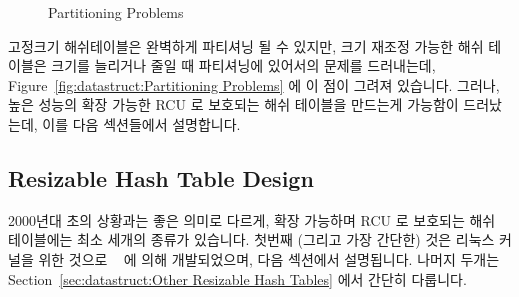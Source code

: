 \begin{figure}[tb]
\centering
{}
\caption{Partitioning Problems}
\end{figure}

고정크기 해쉬테이블은 완벽하게 파티셔닝 될 수 있지만, 크기 재조정 가능한 해쉬
테이블은 크기를 늘리거나 줄일 때 파티셔닝에 있어서의 문제를 드러내는데,
Figure~\ref{fig:datastruct:Partitioning Problems} 에 이 점이 그려져 있습니다.
그러나, 높은 성능의 확장 가능한 RCU 로 보호되는 해쉬 테이블을 만드는게 가능함이
드러났는데, 이를 다음 섹션들에서 설명합니다.

\subsection{Resizable Hash Table Design}
\label{sec:datastruct:Resizable Hash Table Design}

2000년대 초의 상황과는 좋은 의미로 다르게, 확장 가능하며 RCU 로 보호되는 해쉬
테이블에는 최소 세개의 종류가 있습니다.
첫번째 (그리고 가장 간단한) 것은 리눅스 커널을 위한 것으로
~\cite{HerbertXu2010RCUResizeHash} 에 의해 개발되었으며, 다음
섹션에서 설명됩니다.
나머지 두개는
Section~\ref{sec:datastruct:Other Resizable Hash Tables}
에서 간단히 다룹니다.

